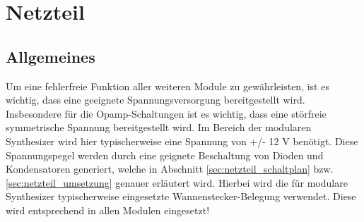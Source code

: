 \chapter{Netzteil}
\label{ch:Netzteil}

\section{Allgemeines}
Um eine fehlerfreie Funktion aller weiteren Module zu gewährleisten, ist es wichtig, dass eine geeignete Spannungsversorgung bereitgestellt wird. 
Insbesondere für die Opamp-Schaltungen ist es wichtig, dass eine störfreie symmetrische Spannung bereitgestellt wird. 
Im Bereich der modularen Synthesizer wird hier typischerweise eine Spannung von +/- 12 V benötigt. Diese Spannungspegel werden durch eine geignete Beschaltung von Dioden und Kondensatoren generiert, welche in Abschnitt \ref{sec:netzteil_schaltplan} bzw. \ref{sec:netzteil_umsetzung} genauer erläutert wird. Hierbei wird die für modulare Synthesizer typischerweise eingesetzte Wannenstecker-Belegung verwendet. Diese wird entsprechend in allen Modulen eingesetzt!

